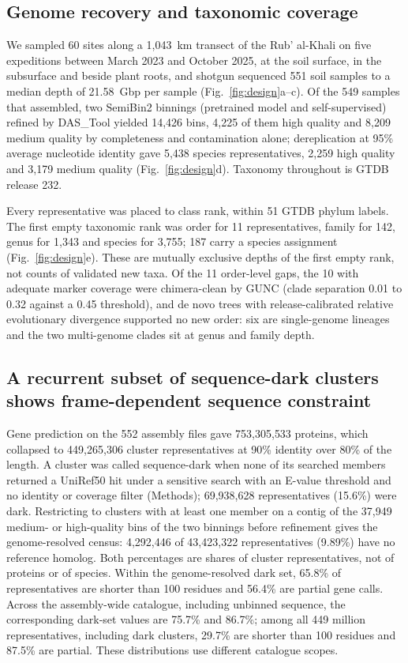 \documentclass[11pt]{article}
\begin{document}
\subsection*{Genome recovery and taxonomic coverage}

We sampled 60 sites along a 1{,}043~km transect of the Rub' al-Khali on five expeditions between
March 2023 and October 2025, at the soil surface, in the subsurface and beside plant roots, and
shotgun sequenced 551 soil samples to a median depth of 21.58~Gbp per sample (Fig.~\ref{fig:design}a--c).
Of the 549 samples that assembled, two SemiBin2 binnings (pretrained model and self-supervised)
refined by DAS\_Tool yielded 14{,}426 bins, 4{,}225 of them high quality and 8{,}209 medium quality
by completeness and contamination alone; dereplication at 95\% average nucleotide identity gave
5{,}438 species representatives, 2{,}259 high quality and 3{,}179 medium quality
(Fig.~\ref{fig:design}d). Taxonomy throughout is GTDB release 232.

Every representative was placed to class rank, within 51 GTDB phylum labels. The first empty
taxonomic rank was order for 11 representatives, family for 142, genus for 1{,}343 and species for
3{,}755; 187 carry a species assignment (Fig.~\ref{fig:design}e). These are mutually exclusive depths of
the first empty rank, not counts of validated new taxa. Of the 11 order-level gaps, the 10 with
adequate marker coverage were chimera-clean by GUNC (clade separation 0.01 to 0.32 against a 0.45
threshold), and de novo trees with release-calibrated relative evolutionary divergence supported no
new order: six are single-genome lineages and the two multi-genome clades sit at genus and family
depth.

\subsection*{A recurrent subset of sequence-dark clusters shows frame-dependent sequence constraint}

Gene prediction on the 552 assembly files gave 753{,}305{,}533 proteins, which collapsed to
449{,}265{,}306 cluster representatives at 90\% identity over 80\% of the length. A cluster was
called sequence-dark when none of its searched members returned a UniRef50 hit under a sensitive
search with an E-value threshold and no identity or coverage filter (Methods); 69{,}938{,}628
representatives (15.6\%) were dark. Restricting to clusters with at least one member on a contig of
the 37{,}949 medium- or high-quality bins of the two binnings before refinement gives the
genome-resolved census: 4{,}292{,}446 of 43{,}423{,}322 representatives (9.89\%) have no reference
homolog. Both percentages are shares of cluster representatives, not of
proteins or of species. Within the genome-resolved dark set, 65.8\% of representatives are
shorter than 100 residues and 56.4\% are partial gene calls. Across the assembly-wide catalogue,
including unbinned sequence, the corresponding dark-set values are 75.7\% and 86.7\%; among all
449 million representatives, including dark clusters, 29.7\% are shorter than 100 residues and
87.5\% are partial. These distributions use different catalogue scopes.
\end{document}
